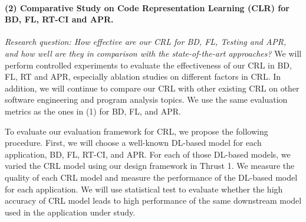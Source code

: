 \paragraph{{\bf (2) Comparative Study on Code Representation Learning (CLR) for BD, FL, RT-CI and APR.}}
{\em Research question: How effective are our CRL for BD, FL, Testing and APR, and how well are they in comparison with the state-of-the-art approaches?} 
We will perform controlled experiments to evaluate the effectiveness of our CRL in BD, FL, RT and APR, especially ablation studies on different factors in CRL. In addition, we will continue to compare our CRL with other existing CRL on other software engineering and program analysis topics. We use the same evaluation metrics as the ones in (1) for BD, FL, and APR.

To evaluate our evaluation framework for CRL, we propose the following
procedure. First, we will choose a well-known DL-based model for each
application, BD, FL, RT-CI, and APR. For each of those DL-based
models, we varied the CRL model using our design framework in Thrust
1. We measure the quality of each CRL model and measure the
performance of the DL-based model for each application. We will use
statistical test to evaluate whether the high accuracy of CRL model
leads to high performance of the same downstream model used in the
application under study.




